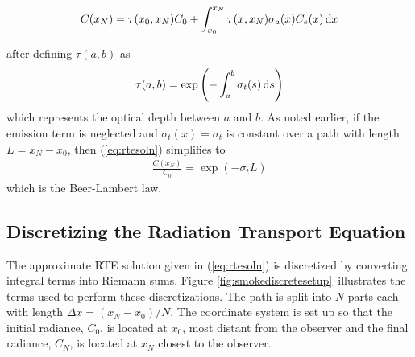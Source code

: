 \begin{equation}
\label{eq:rtesoln}
 C(x_N)=\tau(x_0,x_N)C_0 + \int_{x_0}^{x_N}\tau(x,x_N)\sigma_a(x)C_e(x) \,\mbox{d}x
\end{equation}

\noindent after defining $\tau(a,b)$ as
\begin{equation}
\label{eq:optdepth}
\tau(a,b)=\exp\left({-\int_{a}^{b} \sigma_t(s) \,\mbox{d}s}\right)
\end{equation}
which represents the optical depth between $a$ and $b$.  As noted earlier, if the emission term is neglected and $\sigma_t(x)=\sigma_t$ is constant over a path with length
$L=x_N-x_0$, then (\ref{eq:rtesoln}) simplifies to
\begin{eqnarray}
 \frac{C(x_N)}{C_0}=\exp(-\sigma_tL)
\end{eqnarray}
which is the Beer-Lambert law.


\subsection{Discretizing the Radiation Transport Equation}
\newcommand{\htau}[1]{\tau_{#1}^{N-1}}
\newcommand{\halpha}[1]{\alpha_{#1}^{N-1}}
\newcommand{\sigai}[1]{\sigma_{a,#1}}
\newcommand{\Lei}[1]{C_{e,#1}}
\newcommand{\Lhatj}[1]{C_{#1}^N}
\newcommand{\Lhatjj}[1]{\hat{C}_{#1}^N}
\newcommand{\Chatjj}[1]{\hat{C}_{#1}^N}
\newcommand{\Leii}[1]{\hat{C}_{e,#1}}

The approximate RTE solution given in (\ref{eq:rtesoln}) is
discretized by converting integral terms into Riemann sums. Figure
\ref{fig:smokediscretesetup}\ illustrates the terms used to
perform these discretizations.  The path is split into $N$ parts
each with length $\Delta x=(x_N-x_0)/N$.  The coordinate system is
set up so that the initial radiance, $C_0$, is located at $x_0$,
most distant from the observer and the final radiance, $C_N$, is
located at $x_N$ closest to the observer.

